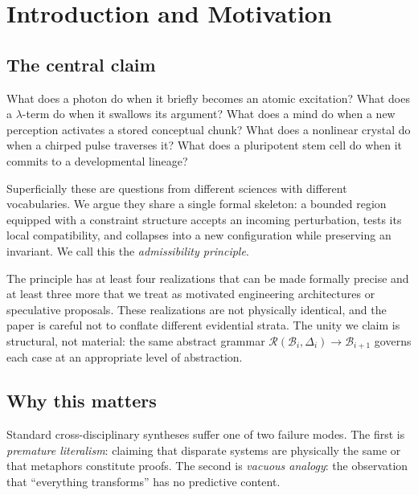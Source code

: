 \documentclass[12pt, a4paper]{article}
\theoremstyle{plain}
\theoremstyle{definition}
\theoremstyle{remark}
\newcommand{\Rcal}{\mathcal{R}}
\newcommand{\Bcal}{\mathcal{B}}
\begin{document}
\tableofcontents
\newpage

\section{Introduction and Motivation}

\subsection{The central claim}

What does a photon do when it briefly becomes an atomic excitation?
What does a $\lambda$-term do when it swallows its argument?
What does a mind do when a new perception activates a stored conceptual chunk?
What does a nonlinear crystal do when a chirped pulse traverses it?
What does a pluripotent stem cell do when it commits to a developmental lineage?

Superficially these are questions from different sciences with different
vocabularies.
We argue they share a single formal skeleton: a bounded region equipped with
a constraint structure accepts an incoming perturbation, tests its local
compatibility, and collapses into a new configuration while preserving an
invariant.
We call this the \emph{admissibility principle}.

The principle has at least four realizations that can be made formally
precise and at least three more that we treat as motivated engineering
architectures or speculative proposals. These realizations are not
physically identical, and the paper is careful not to conflate different
evidential strata.
The unity we claim is structural, not material: the same abstract grammar
$\Rcal(\Bcal_i, \Delta_i) \to \Bcal_{i+1}$ governs each case at an
appropriate level of abstraction.

\subsection{Why this matters}

Standard cross-disciplinary syntheses suffer one of two failure modes.
The first is \emph{premature literalism}: claiming that disparate systems
are physically the same or that metaphors constitute proofs.
The second is \emph{vacuous analogy}: the observation that ``everything
transforms'' has no predictive content.
\end{document}
